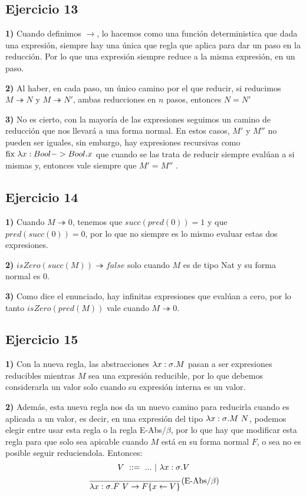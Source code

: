 \documentclass[10pt,a4paper, landscape]{article}
\begin{document}
\begin{multicols}{2}
\subsection{Ejercicio 13}
\textbf{1) }Cuando definimos $\to$, lo hacemos como una función deterministica que dada una expresión, siempre hay una única que regla que aplica para dar un paso en la reducción. Por lo que una expresión siempre reduce a la misma expresión, en un paso.

\textbf{2) } Al haber, en cada paso, un único camino por el que reducir, si reducimos $M\twoheadrightarrow N$ y $M\twoheadrightarrow N'$, ambas reducciones en $n$ pasos, entonces $N = N'$

\textbf{3)} No es cierto, con la mayoría de las expresiones seguimos un camino de reducción que nos llevará a una forma normal. En estos casos, $M'$ y $M''$ no pueden ser iguales, sin embargo, hay expresiones recursivas como $\text{fix } \lambda x: Bool->Bool \text{.} x$ que cuando se las trata de reducir siempre evalúan a si mismas y, entonces vale siempre que $M' = M''$ .

\subsection{Ejercicio 14}
\textbf{1)} Cuando $M \twoheadrightarrow 0$, tenemos que $succ(pred(0)) = 1$ y que $pred(succ(0)) = 0$, por lo que no siempre es lo mismo evaluar estas dos expresiones. 

\textbf{2)} $isZero(succ(M))\twoheadrightarrow false$ solo cuando $M$ es de tipo Nat y su forma normal es $0$. 

\textbf{3)} Como dice el enunciado, hay infinitas expresiones que evalúan a cero, por lo tanto $isZero(pred(M))$ vale cuando $M\twoheadrightarrow 0$.

\subsection{Ejercicio 15}
\textbf{1)} Con la nueva regla, las abstracciones $\lambda x: \sigma \text{.} M$ pasan a ser expresiones reducibles mientras $M$ sea una expresión reducible, por lo que debemos considerarla un valor solo cuando su expresión interna es un valor.

\textbf{2)} Además, esta nueva regla nos da un nuevo camino para reducirla cuando es aplicada a un valor, es decir, en una expresión del tipo $\lambda x: \sigma \text{.} M~N$, podemos elegir entre usar esta regla o la regla E-Abs/$\beta$, por lo que hay que modificar esta regla para que solo sea apicable cuando $M$ está en su forma normal $F$, o sea no es posible seguir reduciendola. Entonces:
$$V~::=~ ...~|~\lambda x: \sigma \text{.} V$$
$$\frac{}{\lambda x: \sigma \text{.} F~V\to F\{x\leftarrow V\}}(\text{E-Abs/}\beta)$$


\end{multicols}
\end{document}
